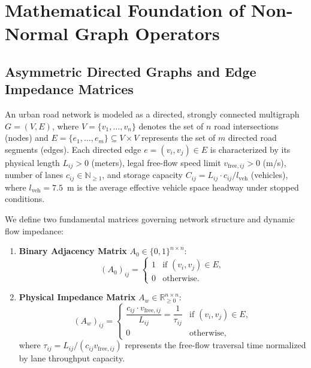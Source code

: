 \documentclass[journal]{IEEEtran}
\begin{document}
\section{Mathematical Foundation of Non-Normal Graph Operators}

\subsection{Asymmetric Directed Graphs and Edge Impedance Matrices}
An urban road network is modeled as a directed, strongly connected multigraph $G = (V, E)$, where $V = \{v_1, \dots, v_n\}$ denotes the set of $n$ road intersections (nodes) and $E = \{e_1, \dots, e_m\} \subseteq V \times V$ represents the set of $m$ directed road segments (edges). Each directed edge $e = (v_i, v_j) \in E$ is characterized by its physical length $L_{ij} > 0$ (meters), legal free-flow speed limit $v_{\text{free}, ij} > 0$ (m/s), number of lanes $c_{ij} \in \mathbb{N}_{\ge 1}$, and storage capacity $C_{ij} = L_{ij} \cdot c_{ij} / l_{\text{veh}}$ (vehicles), where $l_{\text{veh}} = 7.5$~m is the average effective vehicle space headway under stopped conditions.

We define two fundamental matrices governing network structure and dynamic flow impedance:
\begin{enumerate}
    \item \textbf{Binary Adjacency Matrix} $A_0 \in \{0, 1\}^{n \times n}$:
    \begin{equation}
    (A_0)_{ij} = \begin{cases} 1 & \text{if } (v_i, v_j) \in E, \\ 0 & \text{otherwise.} \end{cases}
    \label{eq:binary_A}
    \end{equation}
    \item \textbf{Physical Impedance Matrix} $A_w \in \mathbb{R}_{\ge 0}^{n \times n}$:
    \begin{equation}
    (A_w)_{ij} = \begin{cases} \dfrac{c_{ij} \cdot v_{\text{free}, ij}}{L_{ij}} = \dfrac{1}{\tau_{ij}} & \text{if } (v_i, v_j) \in E, \\ 0 & \text{otherwise,} \end{cases}
    \label{eq:adjacency}
    \end{equation}
    where $\tau_{ij} = L_{ij} / (c_{ij} v_{\text{free}, ij})$ represents the free-flow traversal time normalized by lane throughput capacity.
\end{enumerate}
\end{document}
